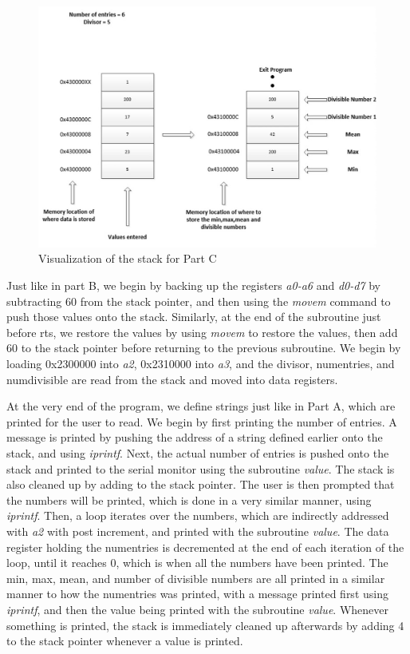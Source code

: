\documentclass[letterpaper]{article}
\begin{document}
    \begin{figure}[h!]
      \centering
      \includegraphics[width=.8\textwidth]{designc.jpg}
      \caption{Visualization of the stack for Part C}
    \end{figure}

    Just like in part B, we begin by backing up the registers \textit{a0-a6} and \textit{d0-d7} by
    subtracting 60 from the stack pointer, and then using the \textit{movem}
    command to push those values onto the stack. Similarly, at the end of the
    subroutine just before rts, we restore the values by using \textit{movem} to restore the values,
    then add 60 to the stack pointer before returning to the previous subroutine.
    We begin by loading 0x2300000 into \textit{a2}, 0x2310000 into \textit{a3},
    and the divisor, numentries, and numdivisible are read from the stack and
    moved into data registers.

    At the very end of the program, we define strings just like
    in Part A, which are printed for the user to read.
    We begin by first printing the number of entries.
    A message is printed by pushing the address of a string defined earlier
    onto the stack, and using \textit{iprintf}. Next, the actual
    number of entries is pushed onto the stack and printed to the
    serial monitor using the subroutine \textit{value}. The stack is also cleaned up by
    adding to the stack pointer. The user is then prompted that the numbers will
    be printed, which is done in a very similar manner, using \textit{iprintf}. Then,
    a loop iterates over the numbers, which are indirectly addressed with \textit{a2} with post increment,
    and printed with the subroutine \textit{value}. The data register holding the numentries
    is decremented at the end of each iteration of the loop, until it reaches 0, which is
    when all the numbers have been printed. The min, max, mean, and number of divisible numbers are all printed
    in a similar manner to how the numentries was printed, with a message
    printed first using \textit{iprintf}, and then the value being printed
    with the subroutine \textit{value}. Whenever something is printed, the stack is
    immediately cleaned up afterwards by adding 4 to the stack pointer whenever a value is printed.
\end{document}

